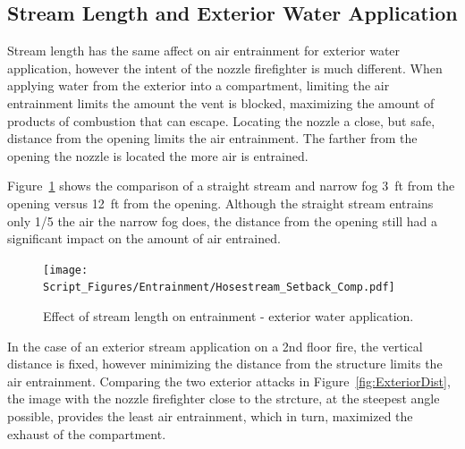 \documentclass[12pt,oneside]{book}
\begin{document}
\subsection{Stream Length and Exterior Water Application}
Stream length has the same affect on air entrainment for exterior water application, however the intent of the nozzle firefighter is much different. When applying water from the exterior into a compartment, limiting the air entrainment limits the amount the vent is blocked, maximizing the amount of products of combustion that can escape. Locating the nozzle a close, but safe, distance from the opening limits the air entrainment. The farther from the opening the nozzle is located the more air is entrained. 

Figure~\ref{fig:Hosestream_Setback_Comp} shows the comparison of a straight stream and narrow fog 3~ft from the opening versus 12~ft from the opening. Although the straight stream entrains only 1/5 the air the narrow fog does, the distance from the opening still had a significant impact on the amount of air entrained.

\begin{figure}[H]
\centering
\texttt{[image: Script\_Figures/Entrainment/Hosestream\_Setback\_Comp.pdf]}
\caption[Effect of Stream Length on Entrainment - Exterior Water Application]{Effect of stream length on entrainment - exterior water application.}
\label{fig:Hosestream_Setback_Comp}
\end{figure}

In the case of an exterior stream application on a 2nd floor fire, the vertical distance is fixed, however minimizing the distance from the structure limits the air entrainment. Comparing the two exterior attacks in Figure~\ref{fig:ExteriorDist}, the image with the nozzle firefighter close to the strcture, at the steepest angle possible, provides the least air entrainment, which in turn, maximized the exhaust of the compartment.
\end{document}

